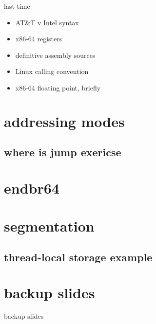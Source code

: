 \date{}
\title{}
\date{}

\begin{frame}
    \titlepage
\end{frame}



\begin{frame}{last time}
    \begin{itemize}
    \item AT\&T v Intel syntax
    \item x86-64 registers
    \item definitive assembly sources
    \item Linux calling convention
    \item x86-64 floating point, briefly
    \end{itemize}
\end{frame}

\section{addressing modes} %



\subsection{where is jump exericse}



\section{endbr64}



\section{segmentation}


\subsection{thread-local storage example}







\section{backup slides}
\begin{frame}{backup slides}
\end{frame}


